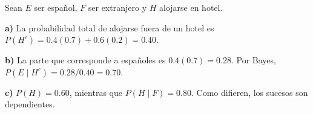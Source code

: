 Sean $E$ ser español, $F$ ser extranjero y $H$ alojarse en hotel.

\textbf{a)} La probabilidad total de alojarse fuera de un hotel es
$P(H^c)=0.4(0.7)+0.6(0.2)=\boxed{0.40}$.

\textbf{b)} La parte que corresponde a españoles es $0.4(0.7)=0.28$.
Por Bayes, $P(E\mid H^c)=0.28/0.40=\boxed{0.70}$.

\textbf{c)} $P(H)=0.60$, mientras que $P(H\mid F)=0.80$.
Como difieren, los sucesos son dependientes.
